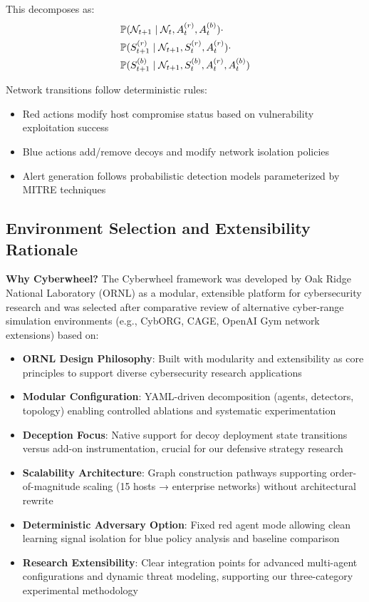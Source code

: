 \documentclass[12pt,twoside]{article}
\theoremstyle{definition}
\theoremstyle{plain}
\begin{document}
This decomposes as:
\begin{align}
&\mathbb{P}(\mathcal{N}_{t+1} \mid \mathcal{N}_t, A_t^{(r)}, A_t^{(b)}) \cdot \\
&\mathbb{P}(S_{t+1}^{(r)} \mid \mathcal{N}_{t+1}, S_t^{(r)}, A_t^{(r)}) \cdot \\
&\mathbb{P}(S_{t+1}^{(b)} \mid \mathcal{N}_{t+1}, S_t^{(b)}, A_t^{(r)}, A_t^{(b)})
\end{align}

Network transitions follow deterministic rules:
\begin{itemize}
    \item Red actions modify host compromise status based on vulnerability exploitation success
    \item Blue actions add/remove decoys and modify network isolation policies
    \item Alert generation follows probabilistic detection models parameterized by MITRE techniques
\end{itemize}

\subsection{Environment Selection and Extensibility Rationale}

\textbf{Why Cyberwheel?} The Cyberwheel framework was developed by Oak Ridge National Laboratory (ORNL) as a modular, extensible platform for cybersecurity research and was selected after comparative review of alternative cyber-range simulation environments (e.g., CybORG, CAGE, OpenAI Gym network extensions) based on:
\begin{itemize}
    \item \textbf{ORNL Design Philosophy}: Built with modularity and extensibility as core principles to support diverse cybersecurity research applications
    \item \textbf{Modular Configuration}: YAML-driven decomposition (agents, detectors, topology) enabling controlled ablations and systematic experimentation
    \item \textbf{Deception Focus}: Native support for decoy deployment state transitions versus add-on instrumentation, crucial for our defensive strategy research
    \item \textbf{Scalability Architecture}: Graph construction pathways supporting order-of-magnitude scaling (15 hosts → enterprise networks) without architectural rewrite
    \item \textbf{Deterministic Adversary Option}: Fixed red agent mode allowing clean learning signal isolation for blue policy analysis and baseline comparison
    \item \textbf{Research Extensibility}: Clear integration points for advanced multi-agent configurations and dynamic threat modeling, supporting our three-category experimental methodology
\end{itemize}
\end{document}
